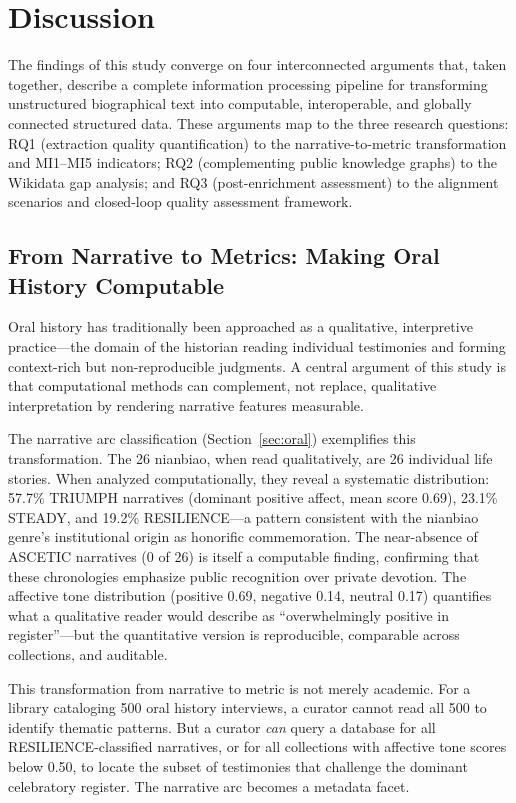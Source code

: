 \documentclass[review]{elsarticle}
\begin{document}
\section{Discussion}

The findings of this study converge on four interconnected arguments that, taken together, describe a complete information processing pipeline for transforming unstructured biographical text into computable, interoperable, and globally connected structured data. These arguments map to the three research questions: RQ1 (extraction quality quantification) to the narrative-to-metric transformation and MI1--MI5 indicators; RQ2 (complementing public knowledge graphs) to the Wikidata gap analysis; and RQ3 (post-enrichment assessment) to the alignment scenarios and closed-loop quality assessment framework.

\subsection{From Narrative to Metrics: Making Oral History Computable}

Oral history has traditionally been approached as a qualitative, interpretive practice---the domain of the historian reading individual testimonies and forming context-rich but non-reproducible judgments. A central argument of this study is that computational methods can complement, not replace, qualitative interpretation by rendering narrative features measurable.

The narrative arc classification (Section~\ref{sec:oral}) exemplifies this transformation. The 26 nianbiao, when read qualitatively, are 26 individual life stories. When analyzed computationally, they reveal a systematic distribution: 57.7\% TRIUMPH narratives (dominant positive affect, mean score 0.69), 23.1\% STEADY, and 19.2\% RESILIENCE---a pattern consistent with the nianbiao genre's institutional origin as honorific commemoration. The near-absence of ASCETIC narratives (0 of 26) is itself a computable finding, confirming that these chronologies emphasize public recognition over private devotion. The affective tone distribution (positive 0.69, negative 0.14, neutral 0.17) quantifies what a qualitative reader would describe as ``overwhelmingly positive in register''---but the quantitative version is reproducible, comparable across collections, and auditable.

This transformation from narrative to metric is not merely academic. For a library cataloging 500 oral history interviews, a curator cannot read all 500 to identify thematic patterns. But a curator \textit{can} query a database for all RESILIENCE-classified narratives, or for all collections with affective tone scores below 0.50, to locate the subset of testimonies that challenge the dominant celebratory register. The narrative arc becomes a metadata facet.
\end{document}
